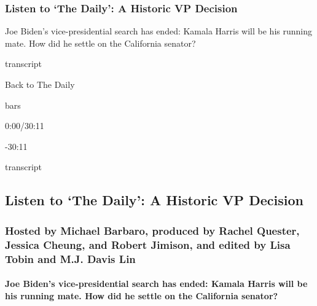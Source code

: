 \hypertarget{listen-to-the-daily-a-historic-vp-decision}{%
\subsubsection{Listen to `The Daily': A Historic VP
Decision}\label{listen-to-the-daily-a-historic-vp-decision}}

Joe Biden's vice-presidential search has ended: Kamala Harris will be
his running mate. How did he settle on the California senator?

transcript

Back to The Daily

bars

0:00/30:11

-30:11

transcript

\hypertarget{listen-to-the-daily-a-historic-vp-decision-1}{%
\subsection{Listen to `The Daily': A Historic VP
Decision}\label{listen-to-the-daily-a-historic-vp-decision-1}}

\hypertarget{hosted-by-michael-barbaro-produced-by-rachel-quester-jessica-cheung-and-robert-jimison-and-edited-by-lisa-tobin-and-mj-davis-lin}{%
\subsubsection{Hosted by Michael Barbaro, produced by Rachel Quester,
Jessica Cheung, and Robert Jimison, and edited by Lisa Tobin and M.J.
Davis
Lin}\label{hosted-by-michael-barbaro-produced-by-rachel-quester-jessica-cheung-and-robert-jimison-and-edited-by-lisa-tobin-and-mj-davis-lin}}

\hypertarget{joe-bidens-vice-presidential-search-has-ended-kamala-harris-will-be-his-running-mate-how-did-he-settle-on-the-california-senator}{%
\paragraph{Joe Biden's vice-presidential search has ended: Kamala Harris
will be his running mate. How did he settle on the California
senator?}\label{joe-bidens-vice-presidential-search-has-ended-kamala-harris-will-be-his-running-mate-how-did-he-settle-on-the-california-senator}}


